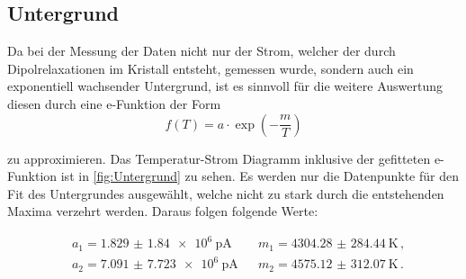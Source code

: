 \subsection{Untergrund}

Da bei der Messung der Daten nicht nur der Strom, welcher der durch Dipolrelaxationen im Kristall entsteht, gemessen wurde, sondern auch ein exponentiell wachsender Untergrund, ist es sinnvoll
für die weitere Auswertung diesen durch eine e-Funktion der Form 
\begin{equation*}
  f(T) = a \cdot \exp(-\frac{m}{T})
\end{equation*}

\noindent 
zu approximieren. Das Temperatur-Strom Diagramm inklusive der gefitteten e-Funktion ist in \autoref{fig:Untergrund} zu sehen. Es werden nur die Datenpunkte für den Fit des Untergrundes
 ausgewählt, welche nicht zu stark durch die entstehenden Maxima verzehrt werden.
Daraus folgen folgende Werte:

\begin{align*}
  &a_1 =  \SI{1.829(1840)e6}{\pico\ampere} &&  m_1 = \SI{4304.28(28444)}{\kelvin} \, ,\\
  &a_2 = \SI{7.091(7723)e6}{\pico\ampere} &&  m_2 = \SI{4575.12(31207)}{\kelvin} \, .\\ 
\end{align*}


